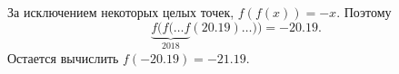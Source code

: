 \solutionSection
За исключением некоторых целых точек, $f(f(x))=-x$. 
Поэтому $$\underbrace{f(f(\ldots f}_{2018}(20.19)\ldots ))=-20.19.$$ 
Остается вычислить $f(-20.19)=-21.19$.
 
